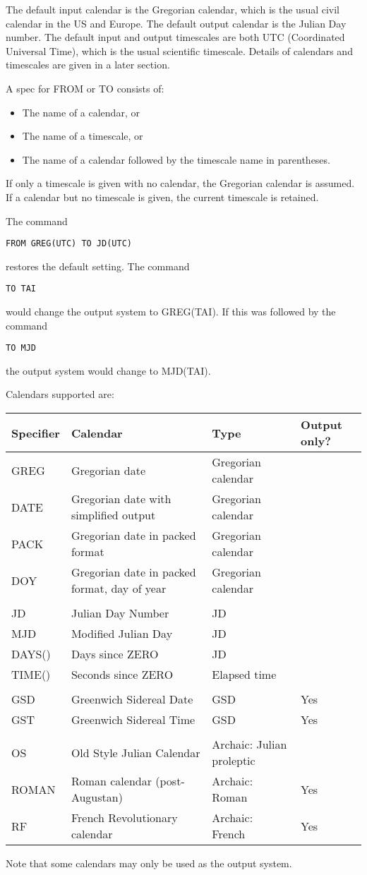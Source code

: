 \documentclass{article}
\begin{document}
The default input calendar is the Gregorian calendar, which
is the usual civil calendar in the US and Europe. The default
output calendar is the Julian Day number. The default input and output
timescales are both UTC (Coordinated Universal Time), which
is the usual scientific timescale. Details of calendars and
timescales are given in a later section.

A spec for FROM or TO consists of:
\begin{itemize}
\item The name of a calendar, or
\item The name of a timescale, or
\item The name of a calendar followed by the timescale name in
parentheses.
\end{itemize}

If only a timescale is given with no calendar, the Gregorian
calendar is assumed. If a calendar but no timescale is given, the current
timescale is retained.

The command 
\begin{verbatim}
FROM GREG(UTC) TO JD(UTC)
\end{verbatim}
restores the default setting.
The command
\begin{verbatim}
TO TAI
\end{verbatim}
would change the output system to GREG(TAI).
If this was followed by the command
\begin{verbatim}
TO MJD
\end{verbatim}
the output system would change to MJD(TAI).


Calendars supported are:
\begin{longtable}{lp{3.0in}ll}
Specifier & Calendar   & Type  & Output only?\\
\hline
GREG      & Gregorian date  & Gregorian calendar\\
DATE      & Gregorian date with simplified output & Gregorian calendar\\
PACK      & Gregorian date in packed format &  Gregorian calendar\\
DOY       & Gregorian date in packed format, day of year& Gregorian calendar\\
\\
JD       & Julian Day Number  & JD \\
MJD      & Modified Julian Day & JD\\
DAYS()   & Days since ZERO     & JD\\
TIME()   & Seconds since ZERO  & Elapsed time\\
\\
GSD       & Greenwich Sidereal Date & GSD & Yes\\
GST       & Greenwich Sidereal Time & GSD & Yes\\
\\
OS        & Old Style Julian Calendar & Archaic: Julian proleptic\\
ROMAN     & Roman calendar (post-Augustan)& Archaic: Roman & Yes\\
RF        & French Revolutionary calendar& Archaic: French & Yes\\
\hline
\end{longtable}
Note that some calendars may only be used as the output system.
\end{document}
